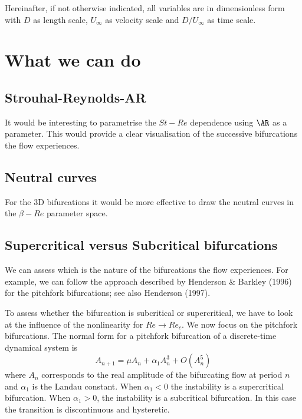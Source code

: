 \documentclass{jfm}
\begin{document}
Hereinafter, if not otherwise indicated, all variables are in dimensionless form with $D$ as length scale, $U_\infty$ as velocity scale and $D/U_\infty$ as time scale.

\section{What we can do}

\subsection{Strouhal-Reynolds-AR}

It would be interesting to parametrise the $St-Re$ dependence using $\AR$ as a parameter. This would provide a clear visualisation of the successive bifurcations the flow experiences.

\subsection{Neutral curves}

For the 3D bifurcations it would be more effective to draw the neutral curves in the $\beta-Re$ parameter space.


\subsection{Supercritical versus Subcritical bifurcations}

We can assess which is the nature of the bifurcations the flow experiences. For example, we can follow the approach described by Henderson \& Barkley (1996) for the pitchfork bifurcations; see also Henderson (1997).

To assess whether the bifurcation is subcritical or supercritical, we have to look at the influence of the nonlinearity for $Re \rightarrow Re_c$. We now focus on the pitchfork bifurcations. The normal form for a pitchfork bifurcation of a discrete-time dynamical system is
%
\begin{equation}
  A_{n+1} = \mu A_n + \alpha_1 A_n^3 + O(A_n^5)
\end{equation}
%
where $A_n$ corresponds to the real amplitude of the bifurcating flow at period $n$ and $\alpha_1$ is the Landau constant. When $\alpha_1<0$ the instability is a supercritical bifurcation. When $\alpha_1>0$, the instability is a subcritical bifurcation. In this case the transition is discontinuous and hysteretic.
\end{document}
